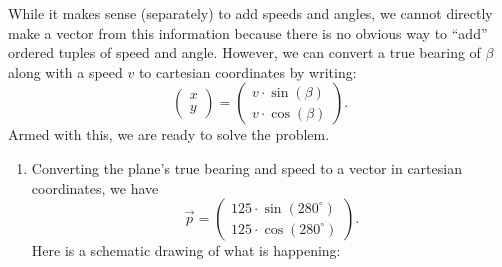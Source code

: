 \documentclass{ximera}
\begin{document}
\begin{example}[Navigation]
\begin{explanation}
While it makes sense (separately) to add speeds and angles, we cannot
directly make a vector from this information because there is no
obvious way to ``add'' ordered tuples of speed and angle. However, we
can convert a true bearing of $\beta$ along with a speed $v$ to
cartesian coordinates by writing:
\[
  \begin{pmatrix} x \\ y \end{pmatrix} =
  \begin{pmatrix} v\cdot \sin(\beta)\\ v \cdot \cos(\beta) \end{pmatrix}.
\]
Armed with this, we are ready to solve the problem.
\begin{enumerate}
\item  Converting the plane's true bearing and speed to a vector in cartesian
  coordinates, we have
  \[
  \vec{p} = \begin{pmatrix}125\cdot \sin(280^\circ)\\ 125 \cdot \cos(280^\circ)\end{pmatrix}.
  \]
  Here is a schematic drawing of what is happening:

  \begin{center}
  \end{center}




\end{enumerate}
\end{explanation}
\end{example}
\end{document}
